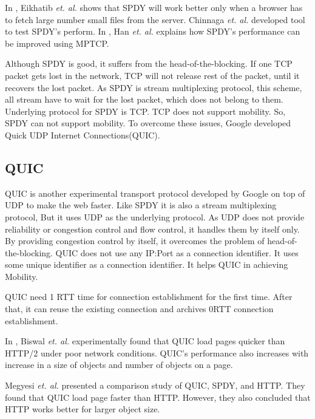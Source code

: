 In \cite{canspdymake}, Eikhatib \textit{et. al.} shows that SPDY will work better only when a browser has to fetch large number small files from the server. Chinnaga \textit{et. al.} developed tool to test SPDY's perform\cite{scalabilitySPDY}. In \cite{han2015anatomy}, Han \textit{et. al.} explains how SPDY's performance can be improved using MPTCP.

Although SPDY is good, it suffers from the head-of-the-blocking. If one TCP packet gets lost in the network, TCP will not release rest of the packet, until it recovers the lost packet. As SPDY is stream multiplexing protocol, this scheme, all stream have to wait for the lost packet, which does not belong to them. Underlying protocol for SPDY is TCP. TCP does not support mobility. So, SPDY can not support mobility. To overcome these issues, Google developed Quick UDP Internet Connections(QUIC).

\subsection{QUIC}
QUIC\cite{quic} is another experimental transport protocol developed by Google on top of UDP to make the web faster. Like SPDY it is also a stream multiplexing protocol, But it uses UDP as the underlying protocol. As UDP does not provide reliability or congestion control and flow control, it handles them by itself only. By providing congestion control by itself, it overcomes the problem of head-of-the-blocking. QUIC does not use any IP:Port as a connection identifier. It uses some unique identifier as a connection identifier. It helps QUIC in achieving Mobility.

QUIC need 1 RTT time for connection establishment for the first time. After that, it can reuse the existing connection and archives 0RTT connection establishment. 

In \cite{quicmakewebfast}, Biswal \textit{et. al.} experimentally found that QUIC load pages quicker than HTTP/2 under poor network conditions. QUIC's performance also increases with increase in a size of objects and number of objects on a page.

Megyesi \textit{et. al.} presented a comparison study of QUIC, SPDY, and HTTP\cite{quicisquic}. They found that QUIC load page faster than HTTP. However, they also concluded that HTTP works better for larger object size.